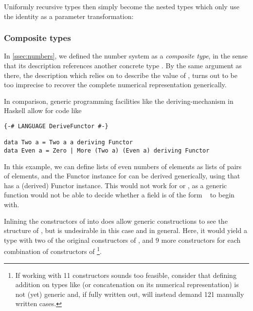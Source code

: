 Uniformly recursive types then simply become the nested types which only use the identity as a parameter transformation:

\subsubsection{Composite types}
In \autoref{ssec:numbers}, we defined the number system  as a \emph{composite type}, in the sense that its description references another concrete type . By the same argument as there, the description  which relies on  to describe the value of , turns out to be too imprecise to recover the complete numerical representation generically. 

In comparison, generic programming facilities like the deriving-mechanism in Haskell allow for code like
\begin{verbatim}
{-# LANGUAGE DeriveFunctor #-}

data Two a = Two a a deriving Functor
data Even a = Zero | More (Two a) (Even a) deriving Functor    
\end{verbatim}
In this example, we can define lists of even numbers of elements as lists of pairs of elements, and the Functor instance for  can be derived generically, using that  has a (derived) Functor instance. This would not work for  or , as a generic function would not be able to decide whether a field is of the form \  to begin with. 

Inlining the constructors of  into  does allow generic constructions to see the structure of , but is undesirable in this case and in general. Here, it would yield a type with two of the original constructors of , and 9 more constructors for each combination of constructors of \footnote{If working with 11 constructors sounds too feasible, consider that defining addition on types like  (or concatenation on its numerical representation) is not (yet) generic and, if fully written out, will instead demand 121 manually written cases.}.

